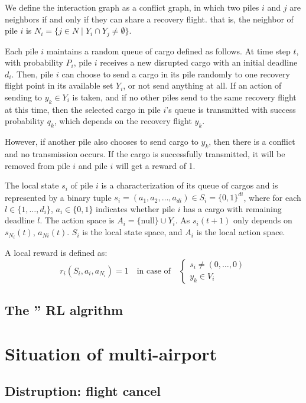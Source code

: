 \documentclass[opre,sglanonrev]{informs4}
\begin{document}
We define the interaction graph as a conflict graph, in which two piles \( i \) and \( j \) are neighbors if and only if they %
can share a recovery flight.  that is, the neighbor of pile \( i \) is \( N_i = \{ j \in N \mid Y_i \cap Y_j \neq \emptyset \} \).

Each pile \( i \) maintains a random queue of cargo defined as follows. At time step \( t \), with probability \( P_i \), pile \( i \) %
receives a new disrupted cargo with an initial deadline \( d_i \). Then, pile \( i \) can choose to send a cargo in its %
pile randomly to one recovery flight point in its available set \( Y_i \), or not send anything at all. If an action of %
sending to \( y_k \in Y_i \) is taken, and if no other piles send to the same recovery flight at this time, then the selected %
cargo in pile \( i \)'s queue is transmitted with success probability \(q_k\), which depends on the recovery flight \( y_k \).
 
However, if another pile also chooses to send cargo to \( y_k \), then there is a conflict and no transmission occurs. %
If the cargo is successfully transmitted, it will be removed from pile \( i \) and pile \( i \) will get a reward of 1. 

The local state \( s_i \) of pile \( i \) is a characterization of its queue of cargos and is represented by a binary tuple %
\( s_i = (a_1, a_2, \dots, a_{di}) \in S_i = \{ 0, 1\}^{di} \), where for each \( l \in \{1, \dots, d_i\} \), %
\( a_i \in \{0,1\} \) indicates whether pile \( i \) has a cargo with remaining deadline %
\( l \). The action space is \( A_i = \{ \text{null} \} \cup Y_i \). As \( s_i(t+1) \) only depends on \( s_{N_i}(t) \), %
\( a_{Ni}(t) \). \( S_i \) is the local state space, and \( A_i \) is the local action space.

A local reward is defined as:
\[
r_i(S_i, a_i, a_{N_i}) = 1 \quad \text{in case of} \quad
\begin{cases}
s_i \neq (0, \dots, 0) \\
y_k \in V_i
\end{cases}
\] 
\subsection{The '' RL algrithm}

\section{Situation of multi-airport}

\subsection{Distruption: flight cancel}
\end{document}
